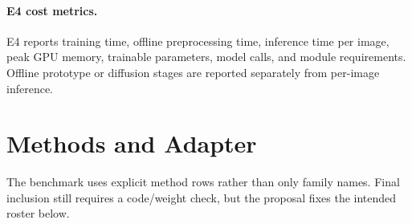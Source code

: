 \documentclass[11pt,a4paper]{article}
\begin{document}
\paragraph{E4 cost metrics.}
E4 reports training time, offline preprocessing time, inference time per image, peak GPU memory, trainable parameters, model calls, and module requirements. Offline prototype or diffusion stages are reported separately from per-image inference.

\section{Methods and Adapter}

The benchmark uses explicit method rows rather than only family names. Final inclusion still requires a code/weight check, but the proposal fixes the intended roster below.
\end{document}
